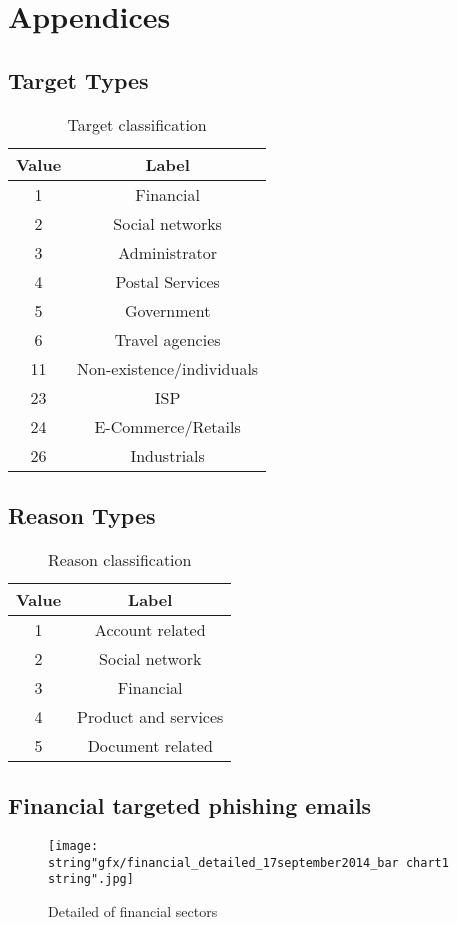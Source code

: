 
\chapter{Appendices }


\section{Target Types }

\begin{table}[H]


\begin{centering}
\begin{tabular}{|c|c|}
\hline 
Value & Label\tabularnewline
\hline 
\hline 
1 & Financial\tabularnewline
\hline 
2 & Social networks\tabularnewline
\hline 
3 & Administrator\tabularnewline
\hline 
4 & Postal Services\tabularnewline
\hline 
5 & Government\tabularnewline
\hline 
6 & Travel agencies\tabularnewline
\hline 
11 & Non-existence/individuals\tabularnewline
\hline 
23 & ISP\tabularnewline
\hline 
24 & E-Commerce/Retails\tabularnewline
\hline 
26 & Industrials\tabularnewline
\hline 
\end{tabular}\protect\caption{\label{tab:Target-classification}Target classification}

\par\end{centering}

\end{table}



\section{Reason Types }

\begin{table}[H]
\centering{}%
\begin{tabular}{|c|c|}
\hline 
Value & Label\tabularnewline
\hline 
\hline 
1 & Account related\tabularnewline
\hline 
2 & Social network\tabularnewline
\hline 
3 & Financial\tabularnewline
\hline 
4 & Product and services\tabularnewline
\hline 
5 & Document related\tabularnewline
\hline 
\end{tabular}\protect\caption{\label{tab:Reason-classification-1}Reason classification}
\end{table}



\section{Financial targeted phishing emails}

\begin{figure}[H]
\begin{centering}
\texttt{[image: \\string"gfx/financial\_detailed\_17september2014\_bar chart1\\string".jpg]}\protect\caption{\label{fig:Detailed-of-financial}Detailed of financial sectors}

\par\end{centering}

\end{figure}

